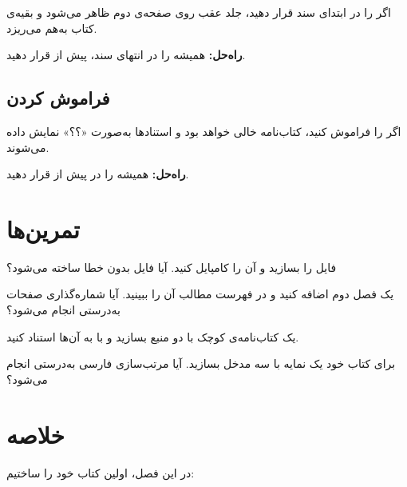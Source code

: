 اگر  را در ابتدای سند قرار
دهید، جلد عقب روی صفحه‌ی دوم ظاهر می‌شود و
بقیه‌ی کتاب به‌هم می‌ریزد.

\textbf{راه‌حل:} همیشه  را در
انتهای سند، پیش از  قرار دهید.

\subsection{فراموش کردن }
\label{sec:first-book-mistake-bibresource}

اگر  را فراموش کنید،
کتاب‌نامه خالی خواهد بود و استنادها به‌صورت
«؟؟» نمایش داده می‌شوند.

\textbf{راه‌حل:} همیشه  را
در پیش از  قرار دهید.

\section{تمرین‌ها}
\label{sec:first-book-exercises}

\begin{exercise}
    فایل  را بسازید و
    آن را کامپایل کنید. آیا فایل  بدون
    خطا ساخته می‌شود؟
    \label{exc:first-book-compile}
\end{exercise}

\begin{exercise}
    یک فصل دوم اضافه کنید و در فهرست مطالب
    آن را ببینید. آیا شماره‌گذاری صفحات به‌درستی
    انجام می‌شود؟
    \label{exc:first-book-second-chapter}
\end{exercise}

\begin{exercise}
    یک کتاب‌نامه‌ی کوچک با دو منبع بسازید
    و با  به آن‌ها استناد کنید.
    \label{exc:first-book-bibliography}
\end{exercise}

\begin{exercise}
    برای کتاب خود یک نمایه با سه مدخل بسازید.
    آیا مرتب‌سازی فارسی به‌درستی انجام می‌شود؟
    \label{exc:first-book-index}
\end{exercise}

\section{خلاصه}
\label{sec:first-book-summary}

در این فصل، اولین کتاب خود را ساختیم:

